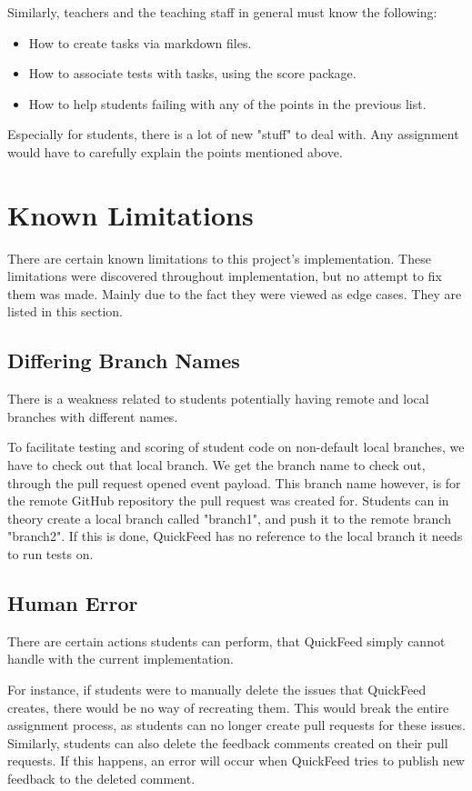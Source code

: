 Similarly, teachers and the teaching staff in general must know the following:
\begin{itemize}
    \item How to create tasks via markdown files.
    \item How to associate tests with tasks, using the score package.
    \item How to help students failing with any of the points in the previous list.
\end{itemize}

Especially for students, there is a lot of new "stuff" to deal with.
Any assignment would have to carefully explain the points mentioned above.

\section{Known Limitations}

There are certain known limitations to this project's implementation.
These limitations were discovered throughout implementation, but no attempt to fix them was made.
Mainly due to the fact they were viewed as edge cases.
They are listed in this section.

\subsection{Differing Branch Names}

There is a weakness related to students potentially having remote and local branches with different names.

To facilitate testing and scoring of student code on non-default local branches, we have to check out that local branch.
We get the branch name to check out, through the pull request opened event payload.
This branch name however, is for the remote GitHub repository the pull request was created for.
Students can in theory create a local branch called "branch1", and push it to the remote branch "branch2".
If this is done, QuickFeed has no reference to the local branch it needs to run tests on.

\subsection{Human Error}

There are certain actions students can perform, that QuickFeed simply cannot handle with the current implementation.

For instance, if students were to manually delete the issues that QuickFeed creates, there would be no way of recreating them.
This would break the entire assignment process, as students can no longer create pull requests for these issues.
Similarly, students can also delete the feedback comments created on their pull requests.
If this happens, an error will occur when QuickFeed tries to publish new feedback to the deleted comment.

